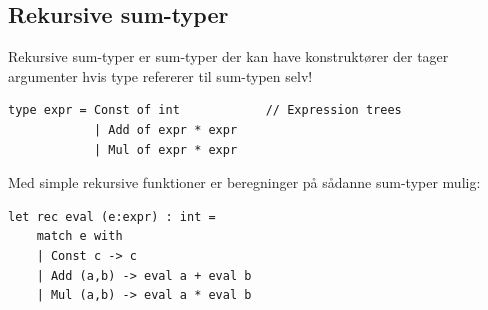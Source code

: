 \documentclass[rgb]{beamer}
\begin{document}
\popmaketitleframe


\subsection{Rekursive sum-typer}

\begin{frame}[fragile]
\begin{footnotesize}

  \vspace{1ex}

  Rekursive sum-typer er sum-typer der kan have konstruktører der tager argumenter hvis type refererer til sum-typen selv!

  \vspace{1ex}


\begin{lstlisting}[numbers=none,frame=none,mathescape]
  type expr = Const of int            // Expression trees
            | Add of expr * expr
            | Mul of expr * expr
\end{lstlisting}

  \vspace{1ex}
  Med simple rekursive funktioner er beregninger på sådanne sum-typer mulig:

  \vspace{1ex}
\begin{minipage}{0.7\textwidth}
  \begin{lstlisting}[numbers=none,frame=none,mathescape]
  let rec eval (e:expr) : int =
    match e with
    | Const c -> c
    | Add (a,b) -> eval a + eval b
    | Mul (a,b) -> eval a * eval b


\end{lstlisting}
\end{minipage}
\end{footnotesize}
\end{frame}
\end{document}
